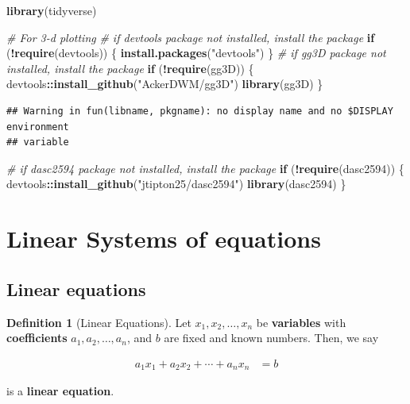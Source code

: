 \documentclass[
]{book}
\newenvironment{Shaded}{\begin{snugshade}}{\end{snugshade}}
\newcommand{\CommentTok}[1]{\textcolor[rgb]{0.56,0.35,0.01}{\textit{#1}}}
\newcommand{\ControlFlowTok}[1]{\textcolor[rgb]{0.13,0.29,0.53}{\textbf{#1}}}
\newcommand{\KeywordTok}[1]{\textcolor[rgb]{0.13,0.29,0.53}{\textbf{#1}}}
\newcommand{\NormalTok}[1]{#1}
\newcommand{\OperatorTok}[1]{\textcolor[rgb]{0.81,0.36,0.00}{\textbf{#1}}}
\newcommand{\StringTok}[1]{\textcolor[rgb]{0.31,0.60,0.02}{#1}}
\theoremstyle{definition}
\newtheorem{definition}{Definition}[chapter]
\theoremstyle{definition}
\theoremstyle{definition}
\theoremstyle{definition}
\theoremstyle{remark}
\begin{document}
\begin{Shaded}
\begin{Highlighting}[]
\KeywordTok{library}\NormalTok{(tidyverse)}

\CommentTok{# For 3-d plotting}
\CommentTok{# if devtools package not installed, install the package}
\ControlFlowTok{if}\NormalTok{ (}\OperatorTok{!}\KeywordTok{require}\NormalTok{(devtools)) \{}
    \KeywordTok{install.packages}\NormalTok{(}\StringTok{"devtools"}\NormalTok{)}
\NormalTok{\}}
\CommentTok{# if gg3D package not installed, install the package}
\ControlFlowTok{if}\NormalTok{ (}\OperatorTok{!}\KeywordTok{require}\NormalTok{(gg3D)) \{}
\NormalTok{    devtools}\OperatorTok{::}\KeywordTok{install_github}\NormalTok{(}\StringTok{"AckerDWM/gg3D"}\NormalTok{)}
    \KeywordTok{library}\NormalTok{(gg3D)}
\NormalTok{\}}
\end{Highlighting}
\end{Shaded}

\begin{verbatim}
## Warning in fun(libname, pkgname): no display name and no $DISPLAY environment
## variable
\end{verbatim}

\begin{Shaded}
\begin{Highlighting}[]
\CommentTok{# if dasc2594 package not installed, install the package}
\ControlFlowTok{if}\NormalTok{ (}\OperatorTok{!}\KeywordTok{require}\NormalTok{(dasc2594)) \{}
\NormalTok{    devtools}\OperatorTok{::}\KeywordTok{install_github}\NormalTok{(}\StringTok{"jtipton25/dasc2594"}\NormalTok{)}
    \KeywordTok{library}\NormalTok{(dasc2594)}
\NormalTok{\}}
\end{Highlighting}
\end{Shaded}

\hypertarget{linear-systems-of-equations-1}{%
\section{Linear Systems of equations}\label{linear-systems-of-equations-1}}

\hypertarget{linear-equations}{%
\subsection{Linear equations}\label{linear-equations}}

\begin{definition}[Linear Equations]
Let \(x_1, x_2, \ldots, x_n\) be \textbf{variables} with \textbf{coefficients} \(a_1, a_2, \ldots, a_n\), and \(b\) are fixed and known numbers. Then, we say

\[
\begin{aligned}
a_1 x_1 + a_2 x_2 + \cdots + a_n x_n & = b
\end{aligned}
\label{eq:linear}
\]

is a \textbf{linear equation}.
\end{definition}
\end{document}
